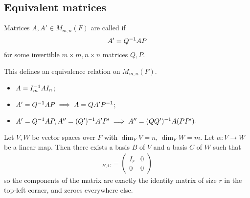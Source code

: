     \subsection{Equivalent matrices}
    \begin{definition}
        Matrices $A, A' \in M_{m, n}(F)$ are called  if
        \begin{align*}
            A' = Q^{-1} AP
        \end{align*}
        for some invertible $m \times m, n \times n$ matrices $Q, P$.
    \end{definition}
    \begin{remark}
        This defines an equivalence relation on $M_{m,n}(F)$.
        \begin{itemize}
            \item $A = I_m^{-1} A I_n$;
            \item $A' = Q^{-1} AP \implies A = Q A' P^{-1}$;
            \item $A' = Q^{-1} AP, A'' = (Q')^{-1} A'P' \implies A'' = (QQ')^{-1} A(PP')$.
        \end{itemize}
    \end{remark}
    \begin{proposition}
        Let $V, W$ be vector spaces over $F$ with $\dim_F V = n$, $\dim_F W = m$.
        Let $\alpha \colon V \to W$ be a linear map.
        Then there exists a basis $B$ of $V$ and a basis $C$ of $W$ such that
        \begin{align*}
            [\alpha]_{B,C} = \begin{pmatrix}
                I_r & 0 \\
                0   & 0
            \end{pmatrix}
        \end{align*}
        so the components of the matrix are exactly the identity matrix of size $r$ in the top-left corner, and zeroes everywhere else.
    \end{proposition}
